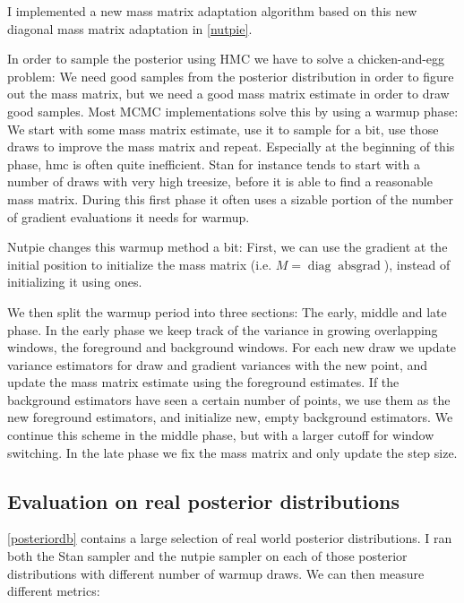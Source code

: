 \documentclass{scrartcl}
\DeclareMathOperator{\diag}{diag}
\DeclareMathOperator{\abs}{abs}
\begin{document}
I implemented a new mass matrix adaptation algorithm based on this new
diagonal mass matrix adaptation in \autoref{nutpie}.

In order to sample the posterior using HMC we have to solve a chicken-and-egg
problem: We need good samples from the posterior distribution in order to
figure out the mass matrix, but we need a good mass matrix estimate in order to
draw good samples. Most MCMC implementations solve this by using a warmup
phase: We start with some mass matrix estimate, use it to sample for a bit, use
those draws to improve the mass matrix and repeat. Especially at the beginning
of this phase, hmc is often quite inefficient. Stan for instance tends to start
with a number of draws with very high treesize, before it is able to find a
reasonable mass matrix. During this first phase it often uses a sizable portion
of the number of gradient evaluations it needs for warmup.

Nutpie changes this warmup method a bit: First, we can use the gradient at the
initial position to initialize the mass matrix (i.e. $M =
\diag{\abs{\text{grad}}}$), instead of initializing it using ones.

We then split the warmup period into three sections: The early, middle and late
phase. In the early phase we keep track of the variance in growing overlapping
windows, the foreground and background windows. For each new draw we update
variance estimators for draw and gradient variances with the new point, and
update the mass matrix estimate using the foreground estimates. If the
background estimators have seen a certain number of points, we use them as the
new foreground estimators, and initialize new, empty background estimators. We
continue this scheme in the middle phase, but with a larger cutoff for window
switching. In the late phase we fix the mass matrix and only update the step
size.

\subsection{Evaluation on real posterior distributions}

\autoref{posteriordb} contains a large selection of real world posterior
distributions. I ran both the Stan sampler and the nutpie sampler on each
of those posterior distributions with different number of warmup draws.
We can then measure different metrics:
\end{document}
